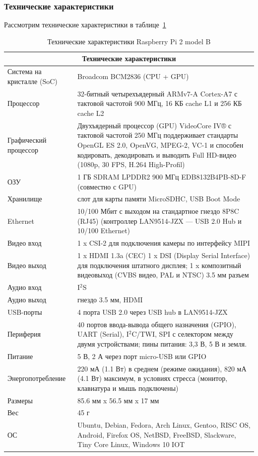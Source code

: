 \subsubsection{Технические характеристики}
Рассмотрим технические характеристики в таблице~\ref{tab:tab2}
\begin{table}[H]
	\caption{Технические характеристики Raspberry Pi 2 model B} \label{tab:tab2}
	\centering
	\begin{tabular}{|p{3.5cm}|p{12cm}|}
		\hline
		\multicolumn{2}{|c|}{Технические характеристики} \\
		\hline 
		Система на кристалле (SoC) & Broadcom BCM2836 (CPU + GPU) \\ 
		\hline 
		Процессор & 32-битный четырехъядерный ARMv7-A Cortex-A7 с тактовой частотой 900 МГц, 16 КБ cache L1 и 256 КБ cache L2 \\ 
		Графический процессор & Двухъядерный процессор (GPU) VideoCore IV® с тактовой частотой 250 МГц поддерживает стандарты OpenGL ES 2.0, OpenVG, MPEG-2, VC-1 и способен кодировать, декодировать и выводить Full HD-видео (1080p, 30 FPS, H.264 High-Profil) \\ 
		\hline 
		ОЗУ & 1 ГБ SDRAM LPDDR2 900 МГц EDB8132B4PB-8D-F (совместно с GPU) \\ 
		\hline 
		Хранилище & слот для карты памяти MicroSDHC, USB Boot Mode \\ 
		\hline 
		Ethernet & 10/100 Мбит с выходом на стандартное гнездо 8P8C (RJ45) (контроллер LAN9514-JZX — USB 2.0 Hub и 10/100 Ethernet) \\ 
		\hline 
		Видео вход & 1 x CSI-2 для подключения камеры по интерфейсу MIPI \\ 
		\hline 
		Видео выход & 1 x HDMI 1.3a (CEC) 1 x DSI (Display Serial Interface) для подключения штатного дисплея; 1 x композитный видеовыход (CVBS видео, PAL и NTSC) 3.5 мм разъем \\ 
		\hline 
		Аудио вход & I$^{2}$S \\ 
		\hline 
		Аудио выход & гнездо 3.5 мм, HDMI \\ 
		\hline 
		USB-порты & 4 порта USB 2.0 через USB hub в LAN9514-JZX \\ 
		\hline 
		Периферия & 40 портов ввода-вывода общего назначения (GPIO), UART (Serial), I$^{2}$C/TWI, SPI с селектором между двумя устройствами; пины питания: 3,3 В, 5 В и земля. \\ 
		\hline 
		Питание & 5 В, 2 А через порт micro-USB или GPIO \\ 
		\hline 
		Энергопотребление & 220 мА (1.1 Вт) в среднем (режиме ожидания), 820 мА (4.1 Вт) максимум, в условиях стресса (монитор, клавиатура и мышь подключены) \\ 
		\hline 
		Размеры & 85.6 мм x 56.5 мм x 17 мм \\ 
		\hline 
		Вес & 45 г \\ 
		\hline 
		ОС & Ubuntu, Debian, Fedora, Arch Linux, Gentoo, RISC OS, Android, Firefox OS, NetBSD, FreeBSD, Slackware, Tiny Core Linux, Windows 10 IOT \\ 
		\hline  
	\end{tabular}	
\end{table}

